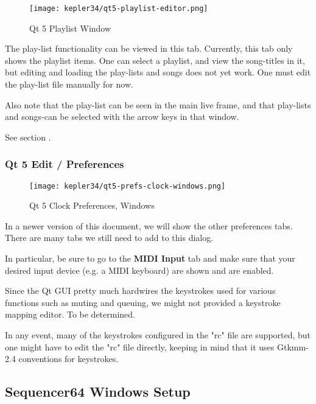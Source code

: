 \begin{figure}[H]
   \centering 
   \texttt{[image: kepler34/qt5-playlist-editor.png]}
   \caption{Qt 5 Playlist Window}
   \label{fig:qt5_playlist_window}
\end{figure}

   The play-list functionality can be viewed in this tab.
   Currently, this tab only shows the playlist items.  One can
   select a playlist, and view the song-titles in it, but
   editing and loading the play-lists and songs does not yet
   work.  One must edit the play-list file manually for now.

   Also note that the play-list can be seen in the main live frame, 
   and that play-lists and songs-can be selected with the arrow keys in that
   window.

   See section .

\subsubsection{Qt 5 Edit / Preferences}
\label{subsubsec:qt_portmidi_qt5_edit_prefs}

\begin{figure}[H]
   \centering 
   \texttt{[image: kepler34/qt5-prefs-clock-windows.png]}
   \caption{Qt 5 Clock Preferences, Windows}
   \label{fig:qt5_prefs_clock_windows}
\end{figure}

   In a newer version of this document, we will show the other preferences
   tabs.  There are many tabs we still need to add to this dialog.

   In particular, be sure to go to the \textbf{MIDI Input} tab and
   make sure that your desired input device (e.g. a MIDI keyboard) are shown
   and are enabled.

   Since the Qt GUI pretty much hardwires the keystrokes used for various
   functions such as muting and queuing, we might not provided a keystroke
   mapping editor.  To be determined.

   In any event, many of the keystrokes configured in the "rc" file are
   supported, but one might have to edit the "rc" file directly, keeping
   in mind that it uses Gtkmm-2.4 conventions for keystrokes.

\subsection{Sequencer64 Windows Setup}
\label{subsec:qt_portmidi_windows_setup}

